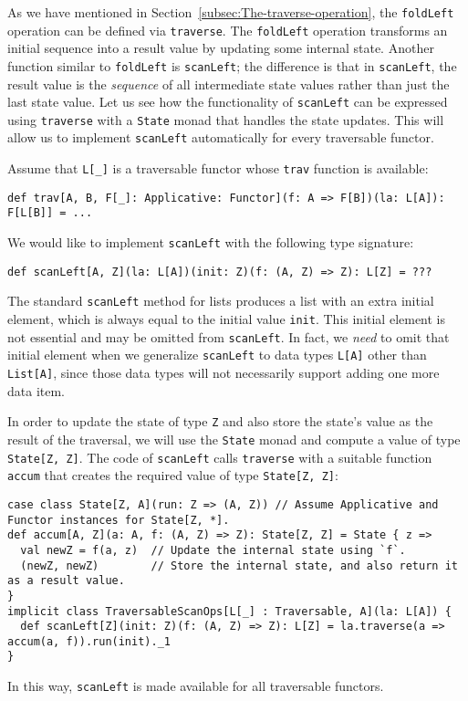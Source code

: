 As we have mentioned in Section~\ref{subsec:The-traverse-operation},
the \lstinline!foldLeft! operation can be defined via \lstinline!traverse!.
The \lstinline!foldLeft! operation transforms an initial sequence
into a result value by updating some internal state. Another function
similar to \lstinline!foldLeft! is \lstinline!scanLeft!; the difference
is that in \lstinline!scanLeft!, the result value is the \emph{sequence}
of all intermediate state values rather than just the last state value.
Let us see how the functionality of \lstinline!scanLeft! can be expressed
using \lstinline!traverse! with a \lstinline!State! monad that handles
the state updates. This will allow us to implement \lstinline!scanLeft!
automatically for every traversable functor.

Assume that \lstinline!L[_]! is a traversable functor whose \lstinline!trav!
function is available:
\begin{lstlisting}
def trav[A, B, F[_]: Applicative: Functor](f: A => F[B])(la: L[A]): F[L[B]] = ...
\end{lstlisting}
We would like to implement \lstinline!scanLeft! with the following
type signature:
\begin{lstlisting}
def scanLeft[A, Z](la: L[A])(init: Z)(f: (A, Z) => Z): L[Z] = ???
\end{lstlisting}
The standard \lstinline!scanLeft! method for lists produces a list
with an extra initial element, which is always equal to the initial
value \lstinline!init!. This initial element is not essential and
may be omitted from \lstinline!scanLeft!. In fact, we \emph{need}
to omit that initial element when we generalize \lstinline!scanLeft!
to data types \lstinline!L[A]! other than \lstinline!List[A]!, since
those data types will not necessarily support adding one more data
item.

In order to update the state of type \lstinline!Z! and also store
the state\textsf{'}s value as the result of the traversal, we will use the
\lstinline!State! monad and compute a value of type \lstinline!State[Z, Z]!.
The code of \lstinline!scanLeft! calls \lstinline!traverse! with
a suitable function \lstinline!accum! that creates the required value
of type \lstinline!State[Z, Z]!:
\begin{lstlisting}
case class State[Z, A](run: Z => (A, Z)) // Assume Applicative and Functor instances for State[Z, *].
def accum[A, Z](a: A, f: (A, Z) => Z): State[Z, Z] = State { z =>
  val newZ = f(a, z)  // Update the internal state using `f`.
  (newZ, newZ)        // Store the internal state, and also return it as a result value.
}
implicit class TraversableScanOps[L[_] : Traversable, A](la: L[A]) {
  def scanLeft[Z](init: Z)(f: (A, Z) => Z): L[Z] = la.traverse(a => accum(a, f)).run(init)._1
}
\end{lstlisting}
In this way, \lstinline!scanLeft! is made available for all traversable
functors.

